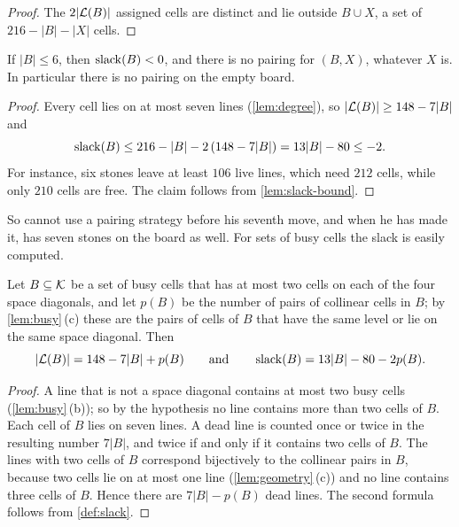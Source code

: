 \begin{proof}
The $2|\mathcal{L}(B)|$ assigned cells are distinct and lie outside $B\cup X$, a set of $216-|B|-|X|$ cells.
\end{proof}

\begin{proposition}\label{prop:seven}
If $|B|\le 6$, then $\operatorname{slack}(B)<0$, and there is no pairing for $(B,X)$, whatever $X$ is. In particular
there is no pairing on the empty board.
\end{proposition}

\begin{proof}
Every cell lies on at most seven lines (\cref{lem:degree}), so $|\mathcal{L}(B)|\ge 148-7|B|$ and
\[
  \operatorname{slack}(B)\le 216-|B|-2\,(148-7|B|)=13|B|-80\le -2 .
\]
For instance, six stones leave at least $106$ live lines, which need $212$ cells, while only $210$ cells
are free. The claim follows from \cref{lem:slack-bound}.
\end{proof}

So \Breaker{} cannot use a pairing strategy before his seventh move, and when he has made it, \Maker{}
has seven stones on the board as well. For sets of busy cells the slack is easily computed.

\begin{lemma}\label{lem:busy-slack}
Let $B\subseteq\mathcal{K}$ be a set of busy cells that has at most two cells on each of the four space
diagonals, and let $p(B)$ be the number of pairs of collinear cells in $B$; by \cref{lem:busy}\,\textup{(c)}
these are the pairs of cells of $B$ that have the same level or lie on the same space diagonal. Then
\[
  |\mathcal{L}(B)|=148-7|B|+p(B)\qquad\text{and}\qquad \operatorname{slack}(B)=13|B|-80-2p(B).
\]
\end{lemma}

\begin{proof}
A line that is not a space diagonal contains at most two busy cells (\cref{lem:busy}\,(b)); so by the
hypothesis no line contains more than two cells of $B$. Each cell of $B$ lies on seven lines. A dead line
is counted once or twice in the resulting number $7|B|$, and twice if and only if it contains two cells
of $B$. The lines with two cells of $B$ correspond bijectively to the collinear pairs in $B$, because
two cells lie on at most one line (\cref{lem:geometry}\,(c)) and no line contains three cells of $B$.
Hence there are $7|B|-p(B)$ dead lines. The second formula follows from \cref{def:slack}.
\end{proof}

